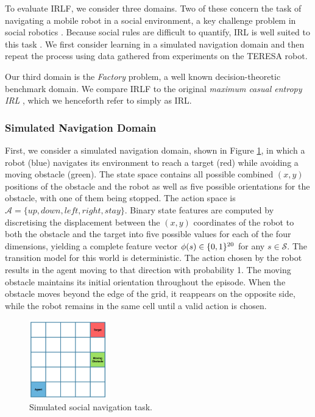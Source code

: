 \documentclass[a4paper,11pt]{report}
\begin{document}
To evaluate IRLF, we consider three domains. Two of these concern the task of navigating a mobile robot in a social environment, a key challenge problem in social robotics \cite{pacchierotti2006embodied}. Because social rules are difficult to quantify, IRL is well suited to this task \cite{henry2010learning,vasquez2014inverse}. We first consider learning in a simulated navigation domain and then repeat the process using data gathered from experiments on the TERESA robot.

 Our third domain is the \emph{Factory} problem, a well known decision-theoretic benchmark domain\cite{dearden1997abstraction}.
 We compare IRLF to the original \emph{maximum casual entropy IRL} \cite{ziebart2008maximum}, which we henceforth refer to simply as IRL. 

\subsubsection{Simulated Navigation Domain \label{sec:sim_nav}}

First, we consider a simulated navigation domain, shown in Figure \ref{fig:gridworld}, in which a robot (blue) navigates its environment to reach a target (red) while avoiding a moving
obstacle (green). The state space contains all possible combined $(x,y)$ positions of the obstacle and the robot as well as five possible orientations for the obstacle, with one of them being stopped. The action space is $\mathcal{A} = \{up,down,left,right,stay\}$. Binary state features are computed by discretising the displacement between the $(x,y)$ coordinates of the robot to both the obstacle and the target into five possible values for each of the four dimensions, yielding a complete feature vector $\phi(s)\in\mathbb \{0,1\}^{20}$ for any $s\in\mathcal{S}$. The transition model for this world is deterministic. The action chosen by the robot results in the agent moving to that direction with probability 1. The moving obstacle maintains its initial orientation throughout the episode. When the obstacle moves beyond the edge of the grid, it reappears on the opposite side, while the robot remains in the same cell until a valid action is chosen.

\begin{figure}
\centering
    \includegraphics[width=0.3\textwidth]{figures/gridworld.png}
  \caption{Simulated social navigation task.} \label{fig:gridworld}
\end{figure}
\end{document}

